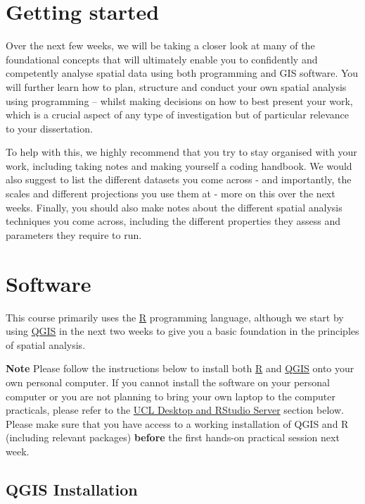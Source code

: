 \documentclass[
]{book}
\begin{document}
\hypertarget{getting-started}{%
\section{Getting started}\label{getting-started}}

Over the next few weeks, we will be taking a closer look at many of the foundational concepts that will ultimately enable you to confidently and competently analyse spatial data using both programming and GIS software. You will further learn how to plan, structure and conduct your own spatial analysis using programming -- whilst making decisions on how to best present your work, which is a crucial aspect of any type of investigation but of particular relevance to your dissertation.

To help with this, we highly recommend that you try to stay organised with your work, including taking notes and making yourself a coding handbook. We would also suggest to list the different datasets you come across - and importantly, the scales and different projections you use them at - more on this over the next weeks. Finally, you should also make notes about the different spatial analysis techniques you come across, including the different properties they assess and parameters they require to run.

\hypertarget{software}{%
\section{Software}\label{software}}

This course primarily uses the \href{https://www.r-project.org/}{R} programming language, although we start by using \href{https://qgis.org/en/site/}{QGIS} in the next two weeks to give you a basic foundation in the principles of spatial analysis.

\textbf{Note}
Please follow the instructions below to install both \href{https://www.r-project.org/}{R} and \href{https://qgis.org/en/site/}{QGIS} onto your own personal computer. If you cannot install the software on your personal computer or you are not planning to bring your own laptop to the computer practicals, please refer to the \protect\hyperlink{ucl}{UCL Desktop and RStudio Server} section below. Please make sure that you have access to a working installation of QGIS and R (including relevant packages) \textbf{before} the first hands-on practical session next week.

\hypertarget{qgis-installation}{%
\subsection{QGIS Installation}\label{qgis-installation}}
\end{document}

